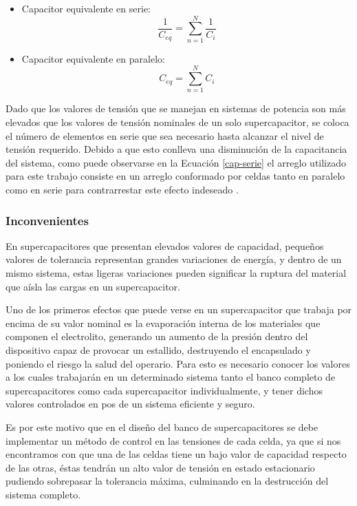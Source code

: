 \begin{itemize}
  \item Capacitor equivalente en serie:
  \begin{equation}
    \frac{1}{C_{eq}} = \sum_{n=1}^{N} \frac{1}{C_i}
    \label{cap-serie}
  \end{equation}
  \item Capacitor equivalente en paralelo:
  \begin{equation}
    C_{eq} = \sum_{n=1}^{N} C_i
    \label{cap-paralelo}
  \end{equation}
\end{itemize}

Dado que los valores de tensión que se manejan en sistemas de potencia son más elevados que los valores de tensión nominales de un solo supercapacitor, se coloca el número de elementos en serie que sea necesario hasta alcanzar el nivel de tensión requerido. Debido a que esto conlleva una disminución de la capacitancia del sistema, como puede observarse en la Ecuación \ref{cap-serie} el arreglo utilizado para este trabajo consiste en un arreglo conformado por celdas tanto en paralelo como en serie para contrarrestar este efecto indeseado \cite{fornaro}.

\subsubsection{Inconvenientes}

En supercapacitores que presentan elevados valores de capacidad, pequeños valores de tolerancia representan grandes variaciones de energía, y dentro de un mismo sistema, estas ligeras variaciones pueden significar la ruptura del material que aísla las cargas en un supercapacitor.

Uno de los primeros efectos que puede verse en un supercapacitor que trabaja por encima de su valor nominal es la evaporación interna de los materiales que componen el electrolito, generando un aumento de la presión dentro del dispositivo capaz de provocar un estallido, destruyendo el encapsulado y poniendo el riesgo la salud del operario. Para esto es necesario conocer los valores a los cuales trabajarán en un determinado sistema tanto el banco completo de supercapacitores como cada supercapacitor individualmente, y tener dichos valores controlados en pos de un sistema eficiente y seguro.

Es por este motivo que en el diseño del banco de supercapacitores se debe implementar un método de control en las tensiones de cada celda, ya que si nos encontramos con que una de las celdas tiene un bajo valor de capacidad respecto de las otras, éstas tendrán un alto valor de tensión en estado estacionario pudiendo sobrepasar la tolerancia máxima, culminando en la destrucción del sistema completo. 

